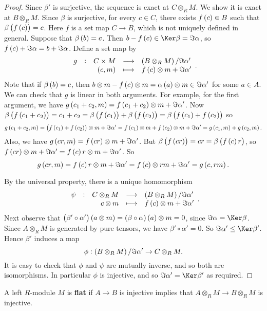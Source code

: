 \begin{proof}
Since $ \beta' $ is surjective, the sequence is exact at $ C \otimes_R M $. We show it is exact at $ B \otimes_R M $. Since $ \beta $ is surjective, for every $ c \in C $, there exists $ f\br{c} \in B $ such that $ \beta\br{f\br{c}} = c $. Here $ f $ is a set map $ C \to B $, which is not uniquely defined in general. Suppose that $ \beta\br{b} = c $. Then $ b - f\br{c} \in \Ker \beta = \Im \alpha $, so $ f\br{c} + \Im \alpha = b + \Im \alpha $. Define a set map by
$$ \function[g]{C \times M}{\br{B \otimes_R M} / \Im \alpha'}{\br{c, m}}{f\br{c} \otimes m + \Im \alpha'}. $$
Note that if $ \beta\br{b} = c $, then $ b \otimes m - f\br{c} \otimes m = \alpha\br{a} \otimes m \in \Im \alpha' $ for some $ a \in A $. We can check that $ g $ is linear in both arguments. For example, for the first argument, we have $ g\br{c_1 + c_2, m} = f\br{c_1 + c_2} \otimes m + \Im \alpha' $. Now $ \beta\br{f\br{c_1 + c_2}} = c_1 + c_2 = \beta\br{f\br{c_1}} + \beta\br{f\br{c_2}} = \beta\br{f\br{c_1} + f\br{c_2}} $ so
$$ g\br{c_1 + c_2, m} = \br{f\br{c_1} + f\br{c_2}} \otimes m + \Im \alpha' = f\br{c_1} \otimes m + f\br{c_2} \otimes m + \Im \alpha' = g\br{c_1, m} + g\br{c_2, m}. $$
Also, we have $ g\br{cr, m} = f\br{cr} \otimes m + \Im \alpha' $. But $ \beta\br{f\br{cr}} = cr = \beta\br{f\br{c}r} $, so $ f\br{cr} \otimes m + \Im \alpha' = f\br{c}r \otimes m + \Im \alpha' $. So
$$ g\br{cr, m} = f\br{c}r \otimes m + \Im \alpha' = f\br{c} \otimes rm + \Im \alpha' = g\br{c, rm}. $$

\pagebreak

By the universal property, there is a unique homomorphism
$$ \function[\psi]{C \otimes_R M}{\br{B \otimes_R M} / \Im \alpha'}{c \otimes m}{f\br{c} \otimes m + \Im \alpha'}. $$
Next observe that $ \br{\beta' \circ \alpha'}\br{a \otimes m} = \br{\beta \circ \alpha}\br{a} \otimes m = 0 $, since $ \Im \alpha = \Ker \beta $. Since $ A \otimes_R M $ is generated by pure tensors, we have $ \beta' \circ \alpha' = 0 $. So $ \Im \alpha' \le \Ker \beta' $. Hence $ \beta' $ induces a map
$$ \phi : \br{B \otimes_R M} / \Im \alpha' \to C \otimes_R M. $$
It is easy to check that $ \phi $ and $ \psi $ are mutually inverse, and so both are isomorphisms. In particular $ \phi $ is injective, and so $ \Im \alpha' = \Ker \beta' $ as required.
\end{proof}

\begin{definition}
A left $ R $-module $ M $ is \textbf{flat} if $ A \to B $ is injective implies that $ A \otimes_R M \to B \otimes_R M $ is injective.
\end{definition}

